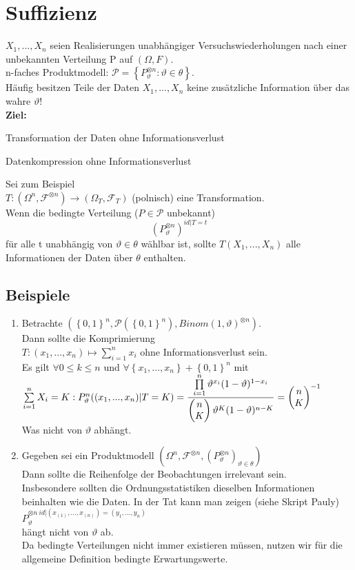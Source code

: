 \documentclass[german,10pt,oneside, fleqn, a4paper]{article}
\newcommand{\ra}{\rightarrow}
\newcommand{\sm}[2][\infty]{\sum\limits_{#2}^{#1}}
\newcommand{\brc}[1]{\left(#1\right)}
\newcommand{\brac}[1]{\left\lbrace #1\right\rbrace}
\newcommand{\mat}[1]{\begin{pmatrix}#1\end{pmatrix}}
\newcommand{\mc}[1]{\mathcal{#1}}
\newcommand{\1}[1]{1_{#1}}
\newcommand{\2}[1]{\1{\brac{#1}}}
\newcommand{\f}{\mc{F}}
\newcommand{\p}{\mc{P}}
\newcommand{\stuff}{{\otimes n}}
\begin{document}
\section{Suffizienz}
$X_1,...,X_n$ seien Realisierungen unabhängiger Versuchswiederholungen nach einer unbekannten Verteilung P auf $(\Omega,F)$.\\
n-faches Produktmodell: $\p=\brac{P_\vartheta^\stuff:\vartheta\in\theta}$.\\
Häufig besitzen Teile der Daten $X_1,...,X_n$ keine zusätzliche Information über das wahre $\vartheta$!\\
\textbf{Ziel:} \begin{list}{•}{}
\item Transformation der Daten ohne Informationsverlust
\item Datenkompression ohne Informationsverlust
\end{list}
Sei zum Beispiel\\
$T:(\Omega^n,\f^\stuff)\ra(\Omega_T,\f_T)$ (polnisch) eine Transformation.\\
Wenn die bedingte Verteilung ($P\in\p$ unbekannt)
\[(P_\vartheta^\stuff)^{id|T=t}\]
für alle t unabhängig von $\vartheta\in\theta$ wählbar ist, sollte $T(X_1,...,X_n)$ alle Informationen der Daten über $\theta$ enthalten.

\subsection{Beispiele}
\label{10.1}
\begin{enumerate}[label=(\roman*)]
\item Betrachte $\brc{\brac{0,1}^n,\p(\brac{0,1}^n), Binom(1,\vartheta)^\stuff}$.\\
Dann sollte die Komprimierung\\
$T:(x_1,...,x_n)\mapsto\sm[n]{i=1}x_i$ ohne Informationsverlust sein.\\
Es gilt $\forall 0\leq k\leq n$ und $\forall\brac{x_1,...,x_n}+\brac{0,1}^n$ mit $\sm[n]{i=1}X_i=K:\\
P_\vartheta^n((x_1,...,x_n)|T=K)=\dfrac{\prod\limits_{i=1}^n\vartheta^{x_i}(1-\vartheta)^{1-x_i}}{\mat{n\\K}\vartheta^K(1-\vartheta)^{n-K}}=\mat{n\\K}^{-1}$\\
Was nicht von $\vartheta$ abhängt.
\item Gegeben sei ein Produktmodell $(\Omega^n,\f^\stuff, (P_\vartheta^\stuff)_{\vartheta\in\theta})$\\
Dann sollte die Reihenfolge der Beobachtungen irrelevant sein.\\ Insbesondere sollten die Ordnungsstatistiken dieselben Informationen beinhalten wie die Daten. In der Tat kann man zeigen (siehe Skript Pauly)\\
$P_\vartheta^{\stuff\  id|(x_{(1)},...,x_{(n)})=(y_1,...,y_n)}$\\
hängt nicht von $\vartheta$ ab.\\
Da bedingte Verteilungen nicht immer existieren müssen, nutzen wir für die allgemeine Definition bedingte Erwartungswerte.
\end{enumerate}
\end{document}
